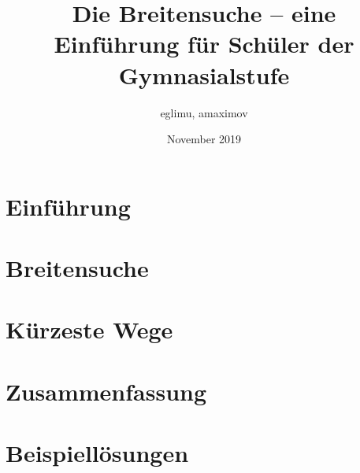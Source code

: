 \documentclass{article}
\title{Die Breitensuche -- eine Einführung für Schüler der Gymnasialstufe}
\author{eglimu, amaximov}
\date{November 2019}
\begin{document}
\maketitle

\tableofcontents

\section{Einführung}


\section{Breitensuche}

\newpage

\section{Kürzeste Wege}

\newpage

\section{Zusammenfassung}

\newpage

\newpage
\section{Beispiellösungen}

\end{document}
